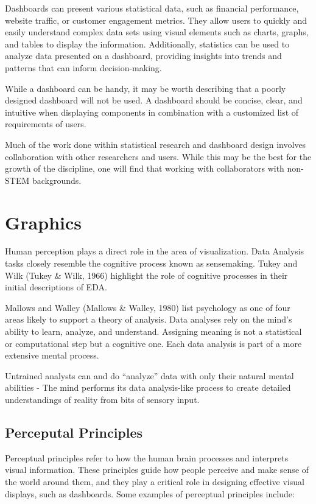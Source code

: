 \documentclass[print]{nuthesis}
\begin{document}
Dashboards can present various statistical data, such as financial performance, website traffic, or customer engagement metrics.
They allow users to quickly and easily understand complex data sets using visual elements such as charts, graphs, and tables to display the information.
Additionally, statistics can be used to analyze data presented on a dashboard, providing insights into trends and patterns that can inform decision-making.

While a dashboard can be handy, it may be worth describing that a poorly designed dashboard will not be used.
A dashboard should be concise, clear, and intuitive when displaying components in combination with a customized list of requirements of users.

Much of the work done within statistical research and dashboard design involves collaboration with other researchers and users.
While this may be the best for the growth of the discipline, one will find that working with collaborators with non-STEM backgrounds.

\hypertarget{graphics}{%
\section{Graphics}\label{graphics}}

Human perception plays a direct role in the area of visualization. Data Analysis tasks closely resemble the cognitive process known as sensemaking. Tukey and Wilk (Tukey \& Wilk, 1966) highlight the role of cognitive processes in their initial descriptions of EDA.

Mallows and Walley (Mallows \& Walley, 1980) list psychology as one of four areas likely to support a theory of analysis. Data analyses rely on the mind's ability to learn, analyze, and understand. Assigning meaning is not a statistical or computational step but a cognitive one. Each data analysis is part of a more extensive mental process.

Untrained analysts can and do ``analyze'' data with only their natural mental abilities - The mind performs its data analysis-like process to create detailed understandings of reality from bits of sensory input.

\hypertarget{perceputal-principles}{%
\subsection{Perceputal Principles}\label{perceputal-principles}}

Perceptual principles refer to how the human brain processes and interprets visual information. These principles guide how people perceive and make sense of the world around them, and they play a critical role in designing effective visual displays, such as dashboards. Some examples of perceptual principles include:
\end{document}
